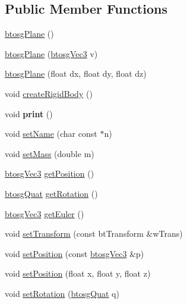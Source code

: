 \subsection*{Public Member Functions}
\begin{DoxyCompactItemize}
\item 
\mbox{\hyperlink{classbtosgPlane_a363737cea03a886470a1a46003706268}{btosg\+Plane}} ()
\item 
\mbox{\hyperlink{classbtosgPlane_a56b020a475b1c955fc50d5c1f6d4d754}{btosg\+Plane}} (\mbox{\hyperlink{classbtosgVec3}{btosg\+Vec3}} v)
\item 
\mbox{\hyperlink{classbtosgPlane_a295ebe4cb55a2786764c7840d10895f4}{btosg\+Plane}} (float dx, float dy, float dz)
\item 
void \mbox{\hyperlink{classbtosgPlane_a0e6812c186ed1fa128dccf7cd2e525a6}{create\+Rigid\+Body}} ()
\item 
\mbox{\label{classbtosgObject_a4432b5c28097065e89e045a8d02c45e6}} 
void {\bfseries print} ()
\item 
void \mbox{\hyperlink{classbtosgObject_ab06a1b3f357209214c6440cd5746523e}{set\+Name}} (char const $\ast$n)
\item 
void \mbox{\hyperlink{classbtosgObject_a91da93c82d48b86192f0cbb16054fe57}{set\+Mass}} (double m)
\item 
\mbox{\hyperlink{classbtosgVec3}{btosg\+Vec3}} \mbox{\hyperlink{classbtosgObject_a3dadd5da8f2a312e44a039446b93d4cd}{get\+Position}} ()
\item 
\mbox{\hyperlink{classbtosgQuat}{btosg\+Quat}} \mbox{\hyperlink{classbtosgObject_a3b825999ad3a51bde743d4085ff19dae}{get\+Rotation}} ()
\item 
\mbox{\hyperlink{classbtosgVec3}{btosg\+Vec3}} \mbox{\hyperlink{classbtosgObject_a2019ec63bde02b72600450c7c985e77a}{get\+Euler}} ()
\item 
void \mbox{\hyperlink{classbtosgObject_ad33fcab26c0c83ccab6dca6906e8cdb0}{set\+Transform}} (const bt\+Transform \&w\+Trans)
\item 
void \mbox{\hyperlink{classbtosgObject_ace6b51040b7ddce90818174200cc6074}{set\+Position}} (const \mbox{\hyperlink{classbtosgVec3}{btosg\+Vec3}} \&p)
\item 
void \mbox{\hyperlink{classbtosgObject_adb9f2cff0faf66dc252cd7c97b11ac84}{set\+Position}} (float x, float y, float z)
\item 
void \mbox{\hyperlink{classbtosgObject_a6365748d5506bb9da31907c9988071fa}{set\+Rotation}} (\mbox{\hyperlink{classbtosgQuat}{btosg\+Quat}} q)

\end{DoxyCompactItemize}
